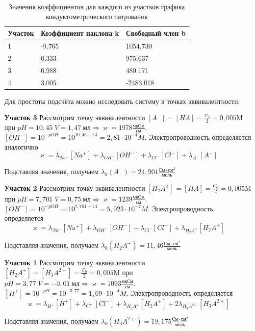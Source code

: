 \documentclass[a4paper, 11pt]{article}%
\begin{document}
    \begin{table}[h!]
    \centering
    \begin{tabular}{|l|l|l|}
    \hline
    Участок & Коэффициент наклона k & Свободный член b \\ \hline
    1       & -9.765                & 1054.730         \\ \hline
    2       & 0.333                 & 975.637          \\ \hline
    3       & 0.988                 & 480.171          \\ \hline
    4       & 3.005                 & -2483.018        \\ \hline
    \end{tabular}
    \caption{Значения коэффициентов для каждого из участков графика кондуктометрического титрования}
    \end{table}
    \par Для простоты подсчёта можно исследовать систему в точках эквивалентности:
    \par \textbf{Участок 3} Рассмотрим точку эквивалентности $[A^{-}]=[HA]= \frac{C_{0}}{2}=0,005 \text{M}$ при $pH = 10,45 \; V = 1,47 \; \text{мл} \Rightarrow \varkappa = 1978 \frac{\text{мкСм}}{\text{см}}$. $[OH^{-}]= 10^{-pOH}=10^{10,45-14}=2,81 \cdot 10^{-4} M$. Электропроводность определяется аналогично
    \[\varkappa = \lambda_{Na^+}[Na^+] + \lambda_{OH^-}[OH^-] + \lambda_{Cl^-}[Cl^-] + \lambda_{A^-}[A^-]\]
    \par Подставляя значения, получаем $\lambda_{0}(A^{-})= 24,901 \frac{\text{См}\cdot\text{см}^{2}}{\text{моль}}$
    \par \textbf{Участок 2} Рассмотрим точку эквивалентности $[H_{2}A^{+}]=[HA]= \frac{C_{0}}{2}=0,005 \text{M}$ при $pH = 7,701 \; V = 0,75 \; \text{мл} \Rightarrow \varkappa = 1239 \frac{\text{мкСм}}{\text{см}}$. $[OH^{-}]= 10^{-pOH}=10^{7,701-14}=5,023 \cdot 10^{-7} M$. Электропроводность определяется
    \[\varkappa = \lambda_{Na^+}[Na^+] + \lambda_{OH^-}[OH^-] + \lambda_{Cl^-}[Cl^-] + \lambda_{H_{2}A^{+}}[H_{2}A^{+}]\]
    \par Подставляя значения, получаем $\lambda_{0}(H_{2}A^{+})= 11,46\frac{\text{См}\cdot\text{см}^{2}}{\text{моль}}$
    \par \textbf{Участок 1} Рассмотрим точку эквивалентности $[H_{2}A^{+}]=[H_{3}A^{2+}]= \frac{C_{0}}{2}=0,005 \text{M}$ при $pH = 3,77 \; V = -0,01 \; \text{мл} \Rightarrow \varkappa = 1093 \frac{\text{мкСм}}{\text{см}}$. $[H^{+}]= 10^{-pH}=10^{-3,77}=1,69 \cdot 10^{-4} M$. Электропроводность определяется
    \[\varkappa =  \lambda_{H^+}[H^+] + \lambda_{Cl^-}[Cl^-] + \lambda_{H_{2}A^{+}}[H_{2}A^{+}] + 2\lambda_{H_{3}A^{2+}}[H_{3}A^{2+}]\]
    \par Подставляя значения, получаем $\lambda_{0}(H_{3}A^{2+})= 19,175\frac{\text{См}\cdot\text{см}^{2}}{\text{моль}}$
\end{document}
